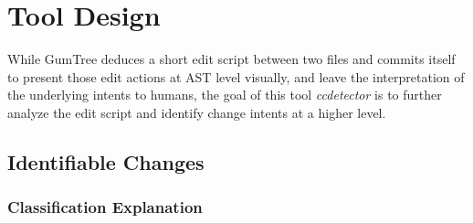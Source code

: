 \chapter{Tool Design}
\label{chap:tool-design}

While GumTree deduces a short edit script between two files and commits itself to present those edit actions at AST level visually, and leave the interpretation of the underlying intents to humans, the goal of this tool \textit{ccdetector} is to further analyze the edit script and identify change intents at a higher level.

\section{Identifiable Changes}

\subsection{Classification Explanation}

